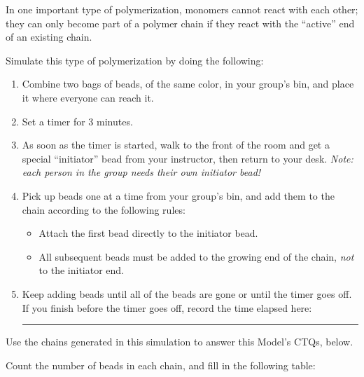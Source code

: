 \begin{activity}
\begin{instructornotes}
\end{instructornotes}

\newcommand{\timeallowed}{3 minutes}

\begin{model}
\label{\labelbase:mdl:chaingrowth}

	In one important type of polymerization, monomers cannot react with each other; they can only become part of a polymer chain if they react with the ``active'' end of an existing chain.
	
	Simulate this type of polymerization by doing the following:
	\begin{enumerate}
		\item Combine two bags of beads, of the same color, in your group's bin, and place it where everyone can reach it.
		\item Set a timer for \timeallowed.
		\item As soon as the timer is started, walk to the front of the room and get a special ``initiator'' bead from your instructor, then return to your desk. \emph{Note: each person in the group needs their own initiator bead!}
		\item Pick up beads one at a time from your group's bin, and add them to the chain according to the following rules:
			\begin{itemize}
				\item Attach the first bead directly to the initiator bead.
				\item All subsequent beads must be added to the growing end of the chain, \emph{not} to the initiator end.
			\end{itemize}
		\item Keep adding beads until all of the beads are gone or until the timer goes off.  If you finish before the timer goes off, record the time elapsed here: \rule{1in}{0.15mm}
	\end{enumerate}
	
	Use the chains generated in this simulation to answer this Model's CTQs, below.

\end{model}

\vspace{0.05in}
\begin{ctqs}

	\question Count the number of beads in each chain, and fill in the following table: \label{\labelbase:ctq:numbeadschain}
		

\end{ctqs}
\end{activity}
